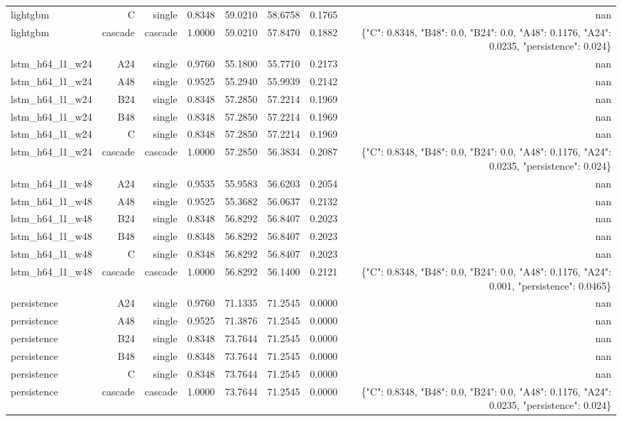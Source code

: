 \begin{table}[htbp]
\begin{tabular}{lrrrrrrr}
lightgbm & C & single & 0.8348 & 59.0210 & 58.6758 & 0.1765 & nan \\
lightgbm & cascade & cascade & 1.0000 & 59.0210 & 57.8470 & 0.1882 & \{"C": 0.8348, "B48": 0.0, "B24": 0.0, "A48": 0.1176, "A24": 0.0235, "persistence": 0.024\} \\
lstm\_h64\_l1\_w24 & A24 & single & 0.9760 & 55.1800 & 55.7710 & 0.2173 & nan \\
lstm\_h64\_l1\_w24 & A48 & single & 0.9525 & 55.2940 & 55.9939 & 0.2142 & nan \\
lstm\_h64\_l1\_w24 & B24 & single & 0.8348 & 57.2850 & 57.2214 & 0.1969 & nan \\
lstm\_h64\_l1\_w24 & B48 & single & 0.8348 & 57.2850 & 57.2214 & 0.1969 & nan \\
lstm\_h64\_l1\_w24 & C & single & 0.8348 & 57.2850 & 57.2214 & 0.1969 & nan \\
lstm\_h64\_l1\_w24 & cascade & cascade & 1.0000 & 57.2850 & 56.3834 & 0.2087 & \{"C": 0.8348, "B48": 0.0, "B24": 0.0, "A48": 0.1176, "A24": 0.0235, "persistence": 0.024\} \\
lstm\_h64\_l1\_w48 & A24 & single & 0.9535 & 55.9583 & 56.6203 & 0.2054 & nan \\
lstm\_h64\_l1\_w48 & A48 & single & 0.9525 & 55.3682 & 56.0637 & 0.2132 & nan \\
lstm\_h64\_l1\_w48 & B24 & single & 0.8348 & 56.8292 & 56.8407 & 0.2023 & nan \\
lstm\_h64\_l1\_w48 & B48 & single & 0.8348 & 56.8292 & 56.8407 & 0.2023 & nan \\
lstm\_h64\_l1\_w48 & C & single & 0.8348 & 56.8292 & 56.8407 & 0.2023 & nan \\
lstm\_h64\_l1\_w48 & cascade & cascade & 1.0000 & 56.8292 & 56.1400 & 0.2121 & \{"C": 0.8348, "B48": 0.0, "B24": 0.0, "A48": 0.1176, "A24": 0.001, "persistence": 0.0465\} \\
persistence & A24 & single & 0.9760 & 71.1335 & 71.2545 & 0.0000 & nan \\
persistence & A48 & single & 0.9525 & 71.3876 & 71.2545 & 0.0000 & nan \\
persistence & B24 & single & 0.8348 & 73.7644 & 71.2545 & 0.0000 & nan \\
persistence & B48 & single & 0.8348 & 73.7644 & 71.2545 & 0.0000 & nan \\
persistence & C & single & 0.8348 & 73.7644 & 71.2545 & 0.0000 & nan \\
persistence & cascade & cascade & 1.0000 & 73.7644 & 71.2545 & 0.0000 & \{"C": 0.8348, "B48": 0.0, "B24": 0.0, "A48": 0.1176, "A24": 0.0235, "persistence": 0.024\} \\

\end{tabular}
\end{table}
